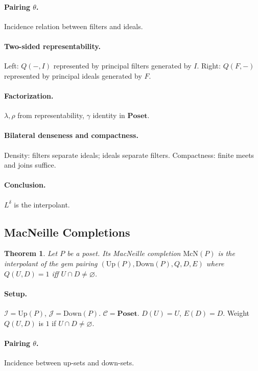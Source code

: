 \documentclass[11pt]{article}
\theoremstyle{plain}
\newtheorem{theorem}{Theorem}[section]
\theoremstyle{definition}
\theoremstyle{remark}
\begin{document}
\paragraph{Pairing $\theta$.}
Incidence relation between filters and ideals.

\paragraph{Two-sided representability.}
Left: $Q(-,I)$ represented by principal filters generated by $I$.  
Right: $Q(F,-)$ represented by principal ideals generated by $F$.

\paragraph{Factorization.}
$\lambda,\rho$ from representability, $\gamma$ identity in $\mathbf{Poset}$.

\paragraph{Bilateral denseness and compactness.}
Density: filters separate ideals; ideals separate filters.  
Compactness: finite meets and joins suffice.

\paragraph{Conclusion.}
$L^{\delta}$ is the interpolant.

\subsection{MacNeille Completions}
\begin{theorem}
Let $P$ be a poset. Its MacNeille completion $\mathrm{McN}(P)$ is the interpolant of the gem pairing $(\mathrm{Up}(P),\mathrm{Down}(P),Q,D,E)$ where $Q(U,D) = 1$ iff $U\cap D\neq\varnothing$.
\end{theorem}

\paragraph{Setup.}
$\mathcal{I}=\mathrm{Up}(P)$, $\mathcal{J}=\mathrm{Down}(P)$. $\mathcal{C}=\mathbf{Poset}$.  
$D(U)=U$, $E(D)=D$. Weight $Q(U,D)$ is $1$ if $U\cap D\neq\varnothing$.

\paragraph{Pairing $\theta$.}
Incidence between up-sets and down-sets.
\end{document}
